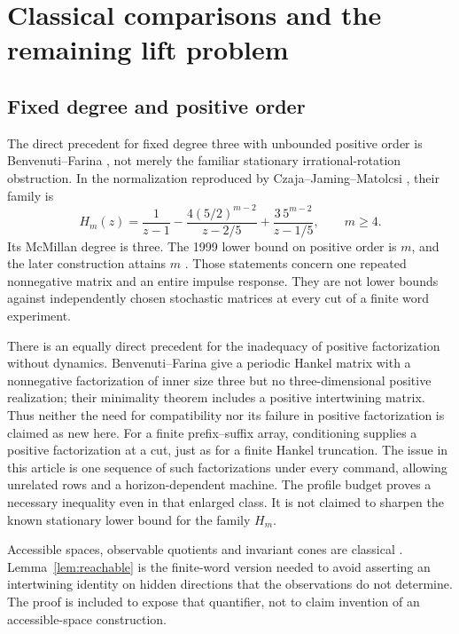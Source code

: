 \section{Classical comparisons and the remaining lift problem}\label{sec:scope}
\subsection{Fixed degree and positive order}
The direct precedent for fixed degree three with unbounded positive order
is Benvenuti--Farina \cite{BF99}, not merely the familiar stationary
irrational-rotation obstruction. In the normalization reproduced by
Czaja--Jaming--Matolcsi \cite[Example 2, equation (3.1)]{CJM}, their family is
\[
 H_m(z)=\frac1{z-1}-\frac{4(5/2)^{m-2}}{z-2/5}
                       +\frac{3\,5^{m-2}}{z-1/5},\qquad m\ge4.
\]
Its McMillan degree is three. The 1999 lower bound on positive order is
$m$, and the later construction attains $m$ \cite{BF99,CJM}.
Those statements concern one repeated nonnegative matrix and an entire
impulse response. They are not lower bounds against independently
chosen stochastic matrices at every cut of a finite word experiment.

There is an equally direct precedent for the inadequacy of positive
factorization without dynamics. Benvenuti--Farina
\cite[Section 3, Example 4 and Theorem 2]{BF03} give a periodic Hankel
matrix with a nonnegative factorization of inner size three but no
three-dimensional positive realization; their minimality theorem includes
a positive intertwining matrix. Thus neither the need for compatibility
nor its failure in positive factorization is claimed as new here.
For a finite prefix--suffix array, conditioning supplies a positive
factorization at a cut, just as for a finite Hankel truncation. The issue
in this article is one sequence of such factorizations under every
command, allowing unrelated rows and a horizon-dependent machine.
The profile budget proves a necessary inequality even in that enlarged
class. It is not claimed to sharpen the known stationary lower bound
for the family $H_m$.

Accessible spaces, observable quotients and invariant cones are classical
\cite{Heller,BF04,Vidyasagar,MW}. Lemma~\ref{lem:reachable} is the
finite-word version needed to avoid asserting an intertwining identity
on hidden directions that the observations do not determine.
The proof is included to expose that quantifier, not to claim invention
of an accessible-space construction.

